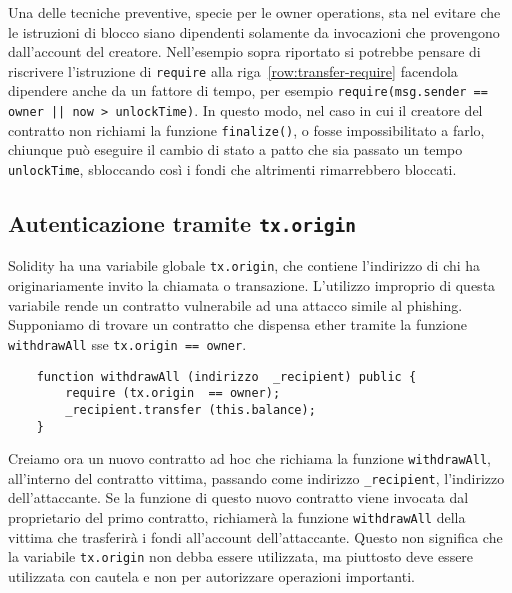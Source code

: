 Una delle tecniche preventive, specie per le owner operations, sta nel evitare che le istruzioni di blocco siano dipendenti solamente da invocazioni che provengono dall'account del creatore. Nell'esempio sopra riportato si potrebbe pensare di riscrivere l'istruzione di \lstinline|require| alla riga~\ref{row:transfer-require} facendola dipendere anche da un fattore di tempo, per esempio \lstinline!require(msg.sender == owner || now > unlockTime)!. In questo modo, nel caso in cui il creatore del contratto non richiami la funzione \lstinline|finalize()|, o fosse impossibilitato a farlo, chiunque può eseguire il cambio di stato a patto che sia passato un tempo \lstinline|unlockTime|, sbloccando così i fondi che altrimenti rimarrebbero bloccati.

\subsection*{Autenticazione tramite \lstinline|tx.origin|}
Solidity ha una variabile globale \lstinline|tx.origin|, che contiene l'indirizzo di chi ha originariamente invito la chiamata o transazione. L'utilizzo improprio di questa variabile rende un contratto vulnerabile ad una attacco simile al phishing. Supponiamo di trovare un contratto che dispensa ether tramite la funzione \lstinline|withdrawAll| sse \lstinline|tx.origin == owner|. 
\begin{lstlisting}
	function withdrawAll (indirizzo  _recipient) public {
		require (tx.origin  == owner);
		_recipient.transfer (this.balance);
	}
\end{lstlisting}
Creiamo ora un nuovo contratto ad hoc che richiama la funzione \lstinline|withdrawAll|, all'interno del contratto vittima, passando come indirizzo \lstinline|_recipient|, l'indirizzo dell'attaccante. Se la funzione di questo nuovo contratto viene invocata dal proprietario del primo contratto, richiamerà la funzione \lstinline|withdrawAll| della vittima che trasferirà i fondi all'account dell'attaccante. Questo non significa che la variabile \lstinline|tx.origin| non debba essere utilizzata, ma piuttosto deve essere utilizzata con cautela e non per autorizzare operazioni importanti. 

